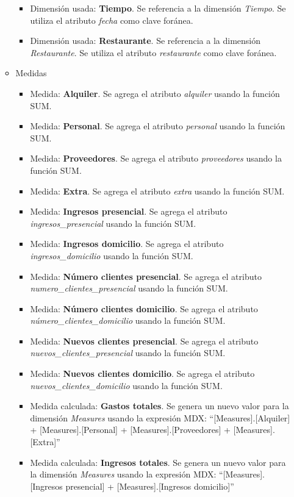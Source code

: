 \documentclass[11pt]{opticajnl}
\begin{document}
\begin{itemize}
\begin{itemize}
\begin{itemize}
\item Dimensión usada: \textbf{Tiempo}. Se referencia a la dimensión \textit{Tiempo}. Se utiliza el atributo \textit{fecha} como clave foránea.
\item Dimensión usada: \textbf{Restaurante}. Se referencia a la dimensión \textit{Restaurante}. Se utiliza el atributo \textit{restaurante} como clave foránea.
\end{itemize}
\item Medidas
\begin{itemize}
\item Medida: \textbf{Alquiler}. Se agrega el atributo \textit{alquiler} usando la función SUM.
\item Medida: \textbf{Personal}. Se agrega el atributo \textit{personal} usando la función SUM.
\item Medida: \textbf{Proveedores}. Se agrega el atributo \textit{proveedores} usando la función SUM.
\item Medida: \textbf{Extra}. Se agrega el atributo \textit{extra} usando la función SUM.
\item Medida: \textbf{Ingresos presencial}. Se agrega el atributo \textit{ingresos\_presencial} usando la función SUM.
\item Medida: \textbf{Ingresos domicilio}. Se agrega el atributo \textit{ingresos\_domicilio} usando la función SUM.
\item Medida: \textbf{Número clientes presencial}. Se agrega el atributo \textit{numero\_clientes\_presencial} usando la función SUM.
\item Medida: \textbf{Número clientes domicilio}. Se agrega el atributo \textit{número\_clientes\_domicilio} usando la función SUM.
\item Medida: \textbf{Nuevos clientes presencial}. Se agrega el atributo \textit{nuevos\_clientes\_presencial} usando la función SUM.
\item Medida: \textbf{Nuevos clientes domicilio}. Se agrega el atributo \textit{nuevos\_clientes\_domicilio} usando la función SUM.
\item Medida calculada: \textbf{Gastos totales}. Se genera un nuevo valor para la dimensión \textit{Measures} usando la expresión MDX: ``[Measures].[Alquiler] + [Measures].[Personal] + [Measures].[Proveedores] + [Measures].[Extra]''
\item Medida calculada: \textbf{Ingresos totales}. Se genera un nuevo valor para la dimensión \textit{Measures} usando la expresión MDX: ``[Measures].[Ingresos presencial] + [Measures].[Ingresos domicilio]''

\end{itemize}
\end{itemize}
\end{itemize}
\end{document}
